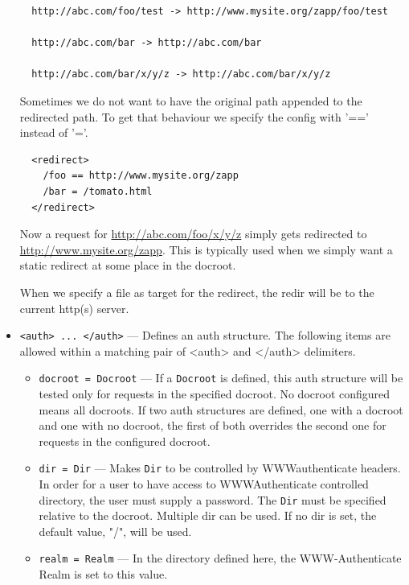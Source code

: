 \documentclass[11pt,oneside,english]{book}
\begin{document}
\begin{itemize}
\begin{verbatim}
  http://abc.com/foo/test -> http://www.mysite.org/zapp/foo/test

  http://abc.com/bar -> http://abc.com/bar

  http://abc.com/bar/x/y/z -> http://abc.com/bar/x/y/z
\end{verbatim}
              Sometimes we do not want to have the original path appended to the
              redirected path. To get that behaviour we specify the config with
              '==' instead of '='.
\begin{verbatim}
  <redirect>
    /foo == http://www.mysite.org/zapp
    /bar = /tomato.html
  </redirect>
\end{verbatim}
              Now a request for \url{http://abc.com/foo/x/y/z} simply gets
              redirected to \url{http://www.mysite.org/zapp}. This is typically
              used when we simply want a static redirect at some place in the
              docroot.

              When we specify a file as target for the redirect, the redir will
              be to the current http(s) server.

\item       \verb+<auth> ... </auth>+ ---
              Defines an auth structure.  The following items are allowed within
              a matching pair of <auth> and </auth> delimiters.

              \begin{itemize}
              \item \verb+docroot = Docroot+ --- If a \verb+Docroot+ is defined,
                this auth structure will be tested only for requests in the
                specified docroot. No docroot configured means all docroots.  If
                two auth structures are defined, one with a docroot and one with
                no docroot, the first of both overrides the second one for
                requests in the configured docroot.

              \item \verb+dir = Dir+ --- Makes \verb+Dir+ to be controlled by
                WWW\-authenticate headers. In order for a user to have access to
                WWW\-Authenticate controlled directory, the user must supply a
                password. The \verb+Dir+ must be specified relative to the
                docroot. Multiple dir can be used. If no dir is set, the default
                value, "/", will be used.

              \item \verb+realm = Realm+ --- In the directory defined here, the
                WWW-Authenticate Realm is set to this value.


\end{itemize}
\end{itemize}
\end{document}
